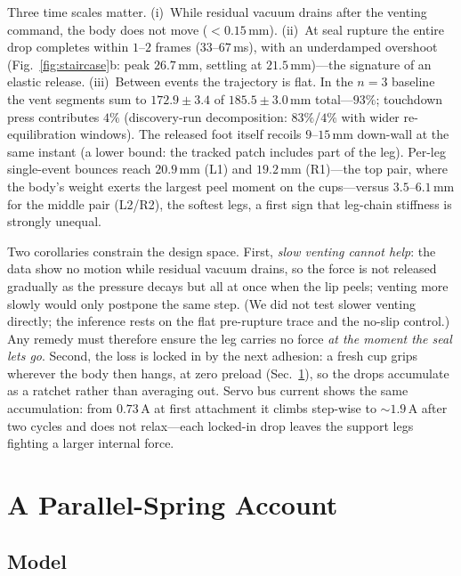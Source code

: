 \documentclass[journal]{IEEEtran}
\begin{document}
Three time scales matter. (i)~While residual vacuum drains after the
venting command, the body does not move ($<0.15$\,mm). (ii)~At seal
rupture the entire drop completes within $1$--$2$ frames
($33$--$67$\,ms), with an underdamped overshoot
(Fig.~\ref{fig:staircase}b: peak $26.7$\,mm, settling at
$21.5$\,mm)---the signature of an elastic release. (iii)~Between events
the trajectory is flat. In the $n{=}3$ baseline the vent segments sum to
$172.9\pm3.4$ of $185.5\pm3.0$\,mm total---$93\%$; touchdown press
contributes $4\%$ (discovery-run decomposition: $83\%$/$4\%$ with wider
re-equilibration windows). The released foot itself recoils
$9$--$15$\,mm down-wall at the same instant (a lower bound: the tracked
patch includes part of the leg). Per-leg single-event bounces reach
$20.9$\,mm (L1) and $19.2$\,mm (R1)---the top pair, where the body's
weight exerts the largest peel moment on the cups---versus
$3.5$--$6.1$\,mm for the middle pair (L2/R2), the softest legs, a first
sign that leg-chain stiffness is strongly unequal.

Two corollaries constrain the design space. First, \emph{slow venting cannot
help}: the data show no motion while residual vacuum drains, so the
force is not released gradually as the pressure decays but all at once
when the lip peels; venting more slowly would only postpone the same
step. (We did not test slower venting directly; the inference rests on
the flat pre-rupture trace and the no-slip control.) Any remedy must
therefore ensure the leg carries no force \emph{at the moment the seal
lets go}. Second, the loss is locked in by
the next adhesion: a fresh cup grips wherever the body then hangs, at
zero preload (Sec.~\ref{sec:model}), so the drops accumulate as a
ratchet rather than averaging out. Servo bus current shows the same
accumulation: from $0.73$\,A at first attachment it climbs
step-wise to ${\sim}1.9$\,A after two cycles and does not relax---each
locked-in drop leaves the support legs fighting a larger internal force.

\section{A Parallel-Spring Account}
\label{sec:model}

\subsection{Model}
\end{document}
